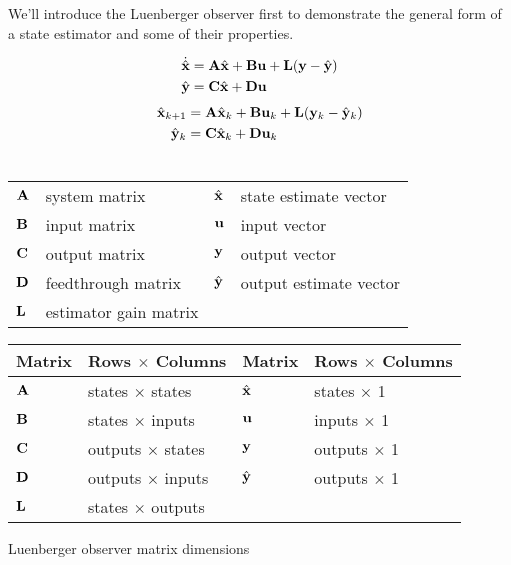 We'll introduce the Luenberger observer first to demonstrate the general form of
a state estimator and some of their properties.
\begin{theorem}
  \begin{align}
    \dot{\hat{\mathbf{x}}} &= \mathbf{A}\hat{\mathbf{x}} + \mathbf{B}\mathbf{u} +
      \mathbf{L} (\mathbf{y} - \hat{\mathbf{y}}) \\
    \hat{\mathbf{y}} &= \mathbf{C}\hat{\mathbf{x}} + \mathbf{D}\mathbf{u}
  \end{align}
  \begin{align}
    \hat{\mathbf{x}}_{k+1} &= \mathbf{A}\hat{\mathbf{x}}_k + \mathbf{B}\mathbf{u}_k +
      \mathbf{L}(\mathbf{y}_k - \hat{\mathbf{y}}_k) \label{eq:z_obsv_x} \\
    \hat{\mathbf{y}}_k &= \mathbf{C}\hat{\mathbf{x}}_k + \mathbf{D}\mathbf{u}_k
      \label{eq:z_obsv_y} \\ \nonumber
  \end{align}
  \begin{figurekey}
    \begin{tabular}{llll}
      $\mathbf{A}$ & system matrix      & $\hat{\mathbf{x}}$ & state estimate vector \\
      $\mathbf{B}$ & input matrix       & $\mathbf{u}$ & input vector \\
      $\mathbf{C}$ & output matrix      & $\mathbf{y}$ & output vector \\
      $\mathbf{D}$ & feedthrough matrix & $\hat{\mathbf{y}}$ & output estimate vector \\
      $\mathbf{L}$ & estimator gain matrix & & \\
    \end{tabular}
  \end{figurekey}
\end{theorem}
\begin{booktable}
  \begin{tabular}{|ll|ll|}
    \hline
    \rowcolor{headingbg}
    \textbf{Matrix} & \textbf{Rows $\times$ Columns} &
    \textbf{Matrix} & \textbf{Rows $\times$ Columns} \\
    \hline
    $\mathbf{A}$ & states $\times$ states & $\hat{\mathbf{x}}$ & states $\times$ 1 \\
    $\mathbf{B}$ & states $\times$ inputs & $\mathbf{u}$ & inputs $\times$ 1 \\
    $\mathbf{C}$ & outputs $\times$ states & $\mathbf{y}$ & outputs $\times$ 1 \\
    $\mathbf{D}$ & outputs $\times$ inputs & $\hat{\mathbf{y}}$ & outputs $\times$ 1 \\
    $\mathbf{L}$ & states $\times$ outputs & & \\
    \hline
  \end{tabular}
  \caption{Luenberger observer matrix dimensions}
\end{booktable}

